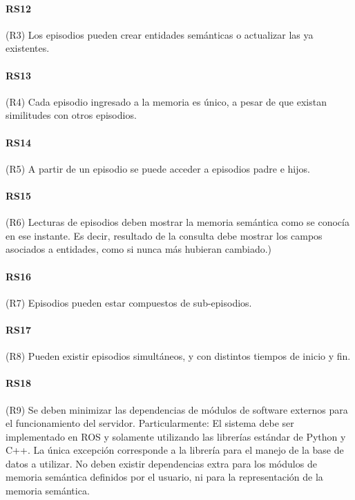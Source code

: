 \paragraph{RS12}
(R3) Los episodios pueden crear entidades semánticas o actualizar las ya existentes.

\paragraph{RS13}
(R4)  Cada episodio ingresado a la memoria es único, a pesar de que existan similitudes con otros episodios.

\paragraph{RS14}
(R5) A partir de un episodio se puede acceder a episodios padre e hijos.

\paragraph{RS15}
(R6)  Lecturas de episodios deben mostrar la memoria semántica como se conocía en ese instante. Es decir, resultado de la consulta debe mostrar los campos asociados a entidades, como si nunca más hubieran cambiado.)

\paragraph{RS16}
(R7) Episodios pueden estar compuestos de sub-episodios.

\paragraph{RS17}
(R8) Pueden existir episodios simultáneos, y con distintos tiempos de inicio y fin.

\paragraph{RS18}
(R9) Se deben minimizar las dependencias de módulos de software externos para el funcionamiento del servidor. Particularmente:
El sistema debe ser implementado en ROS y solamente utilizando las librerías estándar de Python y C++. La única excepción corresponde a la librería para el manejo de la base de datos a utilizar.
No deben existir dependencias extra para los módulos de memoria semántica definidos por el usuario, ni para la representación de la memoria semántica.

